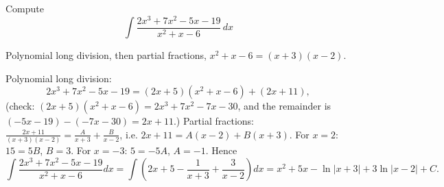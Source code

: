 
\begin{question}
Compute
\[ \int\frac{2x^3+7x^2-5x-19}{x^2+x-6}\,dx \]
\end{question}

\begin{hint}
Polynomial long division, then partial fractions, $x^2+x-6=(x+3)(x-2)$.
\end{hint}

\begin{solution}
Polynomial long division:
\[ 2x^3+7x^2-5x-19=(2x+5)(x^2+x-6)+(2x+11), \]
(check: $(2x+5)(x^2+x-6)=2x^3+7x^2-7x-30$, and the remainder is $(-5x-19)-(-7x-30)=2x+11$.) Partial fractions: $\frac{2x+11}{(x+3)(x-2)}=\frac{A}{x+3}+\frac{B}{x-2}$, i.e. $2x+11=A(x-2)+B(x+3)$. For $x=2$: $15=5B$, $B=3$. For $x=-3$: $5=-5A$, $A=-1$. Hence
\[ \int\frac{2x^3+7x^2-5x-19}{x^2+x-6}dx=\int\left(2x+5-\frac1{x+3}+\frac3{x-2}\right)dx=\boxed{x^2+5x-\ln|x+3|+3\ln|x-2|+C}. \]
\end{solution}

